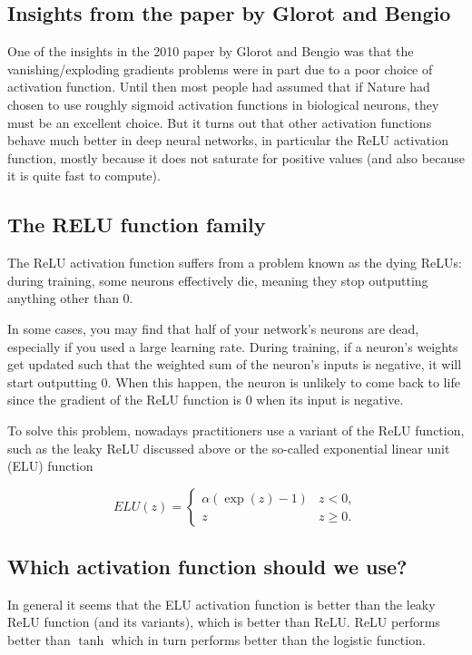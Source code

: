 \documentclass[%
oneside,                 %
final,                   %
10pt]{article}
\begin{document}
\subsection{Insights from the paper by Glorot and Bengio}

One of the insights in the 2010 paper by Glorot and Bengio was that
the vanishing/exploding gradients problems were in part due to a poor
choice of activation function. Until then most people had assumed that
if Nature had chosen to use roughly sigmoid activation functions in
biological neurons, they must be an excellent choice. But it turns out
that other activation functions behave much better in deep neural
networks, in particular the ReLU activation function, mostly because
it does not saturate for positive values (and also because it is quite
fast to compute).

\subsection{The RELU function family}

The ReLU activation function suffers from a problem known as the dying
ReLUs: during training, some neurons effectively die, meaning they
stop outputting anything other than 0.

In some cases, you may find that half of your network’s neurons are
dead, especially if you used a large learning rate. During training,
if a neuron’s weights get updated such that the weighted sum of the
neuron’s inputs is negative, it will start outputting 0. When this
happen, the neuron is unlikely to come back to life since the gradient
of the ReLU function is 0 when its input is negative.

To solve this problem, nowadays practitioners use a variant of the
ReLU function, such as the leaky ReLU discussed above or the so-called
exponential linear unit (ELU) function

\[
ELU(z) = \left\{\begin{array}{cc} \alpha\left( \exp{(z)}-1\right) & z < 0,\\  z & z \ge 0.\end{array}\right. 
\]

\subsection{Which activation function should we use?}

In general it seems that the ELU activation function is better than
the leaky ReLU function (and its variants), which is better than
ReLU. ReLU performs better than $\tanh$ which in turn performs better
than the logistic function.
\end{document}
